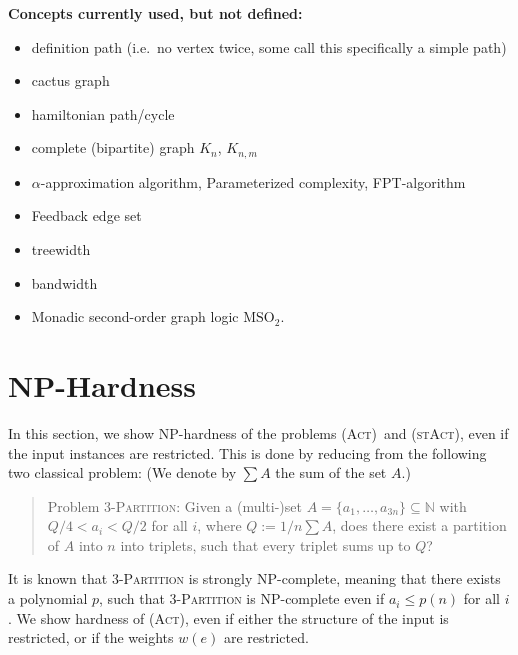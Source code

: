 \documentclass[runningheads]{llncs}
\numberwithin{equation}{section}
\newcommand{\N}{\mathbb{N}}
\newcommand{\set}[1]{\{ #1 \}}
\newcommand{\act}{\textsc{(Act)}}
\newcommand{\stact}{\textsc{(stAct)}}
\begin{document}
\textbf{ Concepts currently used, but not defined: }
\begin{itemize}
\item definition path (i.e.\ no vertex twice, some call this specifically a simple path)
\item cactus graph
\item hamiltonian path/cycle
\item complete (bipartite) graph $K_n$, $K_{n,m}$
\item $\alpha$-approximation algorithm, Parameterized complexity, FPT-algorithm
\item Feedback edge set
\item treewidth
\item bandwidth
\item Monadic second-order graph logic $\text{MSO}_2$.
\end{itemize}

\section{NP-Hardness}
\label{sec:hardness}

In this section, we show NP-hardness of the problems \act\ and \stact, even if the input instances are restricted. This is done by reducing from the following two classical problem: (We denote by $\sum A$ the sum of the set $A$.)


\begin{quote}

Problem \textsc{3-Partition}: Given a (multi-)set $A = \set{a_1, \ldots, a_{3n}} \subseteq \N$ with $Q/4 < a_i < Q/2$ for all $i$, where $Q := 1/n \sum A$, does there exist a partition of $A$ into $n$ into triplets, such that every triplet sums up to $Q$?

\end{quote}

It is known  that \textsc{3-Partition} is strongly NP-complete, meaning that there exists a polynomial $p$, such that \textsc{3-Partition} is NP-complete even if $a_i \leq p(n)$ for all $i$.
We show hardness of {\act}, even if either the structure of the input is restricted, or if the weights $w(e)$ are restricted.
\end{document}
